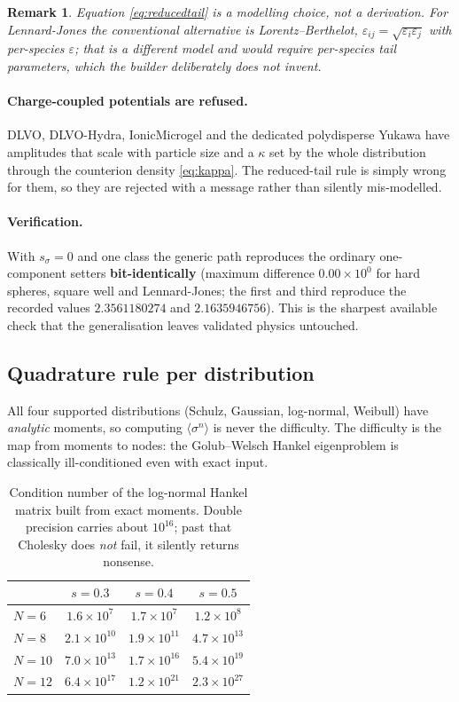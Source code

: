 \documentclass[11pt,a4paper]{article}
\newtheorem{remark}{Remark}
\begin{document}
\begin{remark}
Equation \eqref{eq:reducedtail} is a modelling choice, not a derivation. For
Lennard-Jones the conventional alternative is Lorentz--Berthelot,
$\varepsilon_{ij}=\sqrt{\varepsilon_i\varepsilon_j}$ with per-species
$\varepsilon$; that is a different model and would require per-species tail
parameters, which the builder deliberately does not invent.
\end{remark}

\paragraph{Charge-coupled potentials are refused.} DLVO, DLVO-Hydra,
IonicMicrogel and the dedicated polydisperse Yukawa have amplitudes that scale
with particle size and a $\kappa$ set by the whole distribution through the
counterion density \eqref{eq:kappa}. The reduced-tail rule is simply wrong for
them, so they are rejected with a message rather than silently mis-modelled.

\paragraph{Verification.} With $s_\sigma=0$ and one class the generic path
reproduces the ordinary one-component setters \textbf{bit-identically}
(maximum difference $0.00\times10^{0}$ for hard spheres, square well and
Lennard-Jones; the first and third reproduce the recorded values $2.3561180274$
and $2.1635946756$). This is the sharpest available check that the
generalisation leaves validated physics untouched.

\subsection{Quadrature rule per distribution}
\label{sec:nodes}

All four supported distributions (Schulz, Gaussian, log-normal, Weibull) have
\emph{analytic} moments, so computing $\langle\sigma^n\rangle$ is never the
difficulty. The difficulty is the map from moments to nodes: the Golub--Welsch
Hankel eigenproblem is classically ill-conditioned even with exact input.

\begin{table}[htbp]
\centering
\caption{Condition number of the log-normal Hankel matrix built from exact
moments. Double precision carries about $10^{16}$; past that Cholesky does
\emph{not} fail, it silently returns nonsense.}
\begin{tabular}{lccc}
\toprule
 & $s=0.3$ & $s=0.4$ & $s=0.5$\\
\midrule
$N=6$  & $1.6\times10^{7}$  & $1.7\times10^{7}$  & $1.2\times10^{8}$\\
$N=8$  & $2.1\times10^{10}$ & $1.9\times10^{11}$ & $4.7\times10^{13}$\\
$N=10$ & $7.0\times10^{13}$ & $1.7\times10^{16}$ & $5.4\times10^{19}$\\
$N=12$ & $6.4\times10^{17}$ & $1.2\times10^{21}$ & $2.3\times10^{27}$\\
\bottomrule
\end{tabular}
\end{table}
\end{document}
